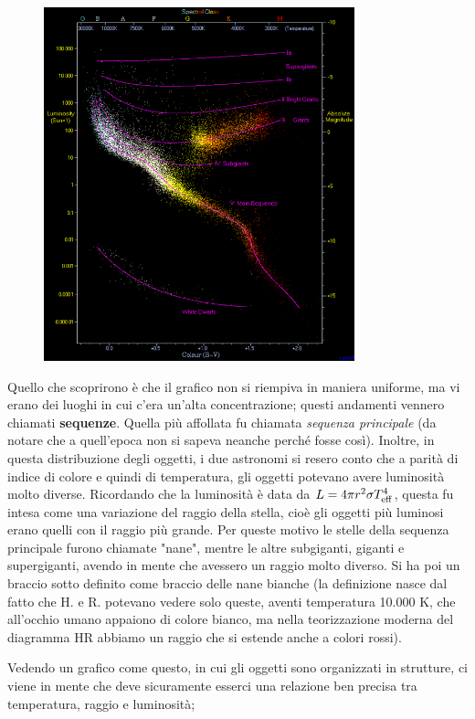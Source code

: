 \begin{figure}[H]
   \centering
   \includegraphics[width=9cm]{immagini/diagramma_HR.png}
\end{figure}

Quello che scoprirono è che il grafico non si riempiva in maniera uniforme, ma vi erano dei luoghi in cui c'era un'alta concentrazione; questi andamenti vennero chiamati \textbf{sequenze}. Quella più affollata fu chiamata \textit{sequenza principale} (da notare che a quell'epoca non si sapeva neanche perché fosse così). Inoltre, in questa distribuzione degli oggetti, i due astronomi si resero conto che a parità di indice di colore e quindi di temperatura, gli oggetti potevano avere luminosità molto diverse. Ricordando che la luminosità è data da $L=4 \pi r^2 \sigma T_{\rm eff}^4$, questa fu intesa come una variazione del raggio della stella, cioè gli oggetti più luminosi erano quelli con il raggio più grande. Per queste motivo le stelle della sequenza principale furono chiamate "nane", mentre le altre subgiganti, giganti e supergiganti, avendo in mente che avessero un raggio molto diverso. Si ha poi un braccio sotto definito come braccio delle nane bianche (la definizione nasce dal fatto che H. e R. potevano vedere solo queste, aventi temperatura 10.000 K, che all'occhio umano appaiono di colore bianco, ma nella teorizzazione moderna del diagramma HR abbiamo un raggio che si estende anche a colori rossi).

Vedendo un grafico come questo, in cui gli oggetti sono organizzati in strutture, ci viene in mente che deve sicuramente esserci una relazione ben precisa tra temperatura, raggio e luminosità; %

